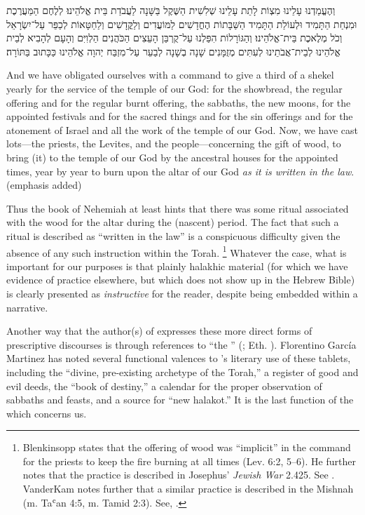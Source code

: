 \begin{hebrewtext}
    וְהֶעֱמַדְנוּ עָלֵינוּ מִצְוֹת לָתֵת עָלֵינוּ שְׁלִשִׁית הַשֶּׁקֶל בַּשָּׁנָה לַעֲבֹדַת בֵּית אֱלֹהֵינוּ׃ 
    לְלֶחֶם הַמַּעֲרֶכֶת וּמִנְחַת הַתָּמִיד וּלְעוֹלַת הַתָּמִיד הַשַּׁבָּתוֹת הֶחֳדָשִׁים לַמּוֹעֲדִים וְלַקֳּדָשִׁים וְלַחַטָּאוֹת לְכַפֵּר עַל־יִשְׂרָאֵל וְכֹל מְלֶאכֶת בֵּית־אֱלֹהֵינוּ׃
    וְהַגּוֹרָלוֹת הִפַּלְנוּ עַל־קֻרְבַּן הָעֵצִים הַכֹּהֲנִים הַלְוִיִּם וְהָעָם לְהָבִיא לְבֵית אֱלֹהֵינוּ לְבֵית־אֲבֹתֵינוּ לְעִתִּים מְזֻמָּנִים שָׁנָה בְשָׁנָה לְבַעֵר עַל־מִזְבַּח יְהוָה אֱלֹהֵינוּ כַּכָּתוּב בַּתּוֹרָה׃
\end{hebrewtext}
\begin{translation}
    And we have obligated ourselves with a command to give a third of a shekel yearly for the service of the temple of our God:
    for the showbread, the regular offering and for the regular burnt offering, the sabbaths, the new moons, for the appointed festivals and for the sacred things and for the sin offerings and for the atonement of Israel and all the work of the temple of our God.
    Now, we have cast lots---the priests, the Levites, and the people---concerning the gift of wood, to bring (it) to the temple of our God by the ancestral houses for the appointed times, year by year to burn upon the altar of \yahweh our God \emph{as it is written in the law}. (emphasis added)
\end{translation}
\noindent
Thus the book of Nehemiah at least hints that there was some ritual associated with the wood for the altar during the (nascent) \secondtemple period. The fact that such a ritual is described as ``written in the law'' is a conspicuous difficulty given the absence of any such instruction within the Torah.%
    \footnote{Blenkinsopp states that the offering of wood was ``implicit'' in the command for the priests to keep the fire burning at all times (Lev. 6:2, 5--6). He further notes that the practice is described in Josephus' \emph{Jewish War} 2.425. See \cite[317]{blenkinsopp1988}. VanderKam notes further that a similar practice is described in the Mishnah (m. Taʿan 4:5, m. Tamid 2:3). See, \cite[636]{vanderkam2018}.}
Whatever the case, what is important for our purposes is that plainly halakhic material (for which we have evidence of practice elsewhere, but which does not show up in the Hebrew Bible) is clearly presented as \emph{instructive} for the reader, despite being embedded within a narrative.

Another way that the author(s) of \jub expresses these more direct forms of prescriptive discourses is through references to ``the \heavenlytablets'' (\HT; Eth. ). Florentino García Martinez has noted several functional valences to \jub's literary use of these tablets, including  the ``divine, pre-existing archetype of the Torah,'' a register of good and evil deeds, the ``book of destiny,'' a calendar for the proper observation of sabbaths and feasts, and a source for ``new halakot.''\autocite{martinez_najman-tigchelaar2012} It is the last function of the \HT which concerns us.

